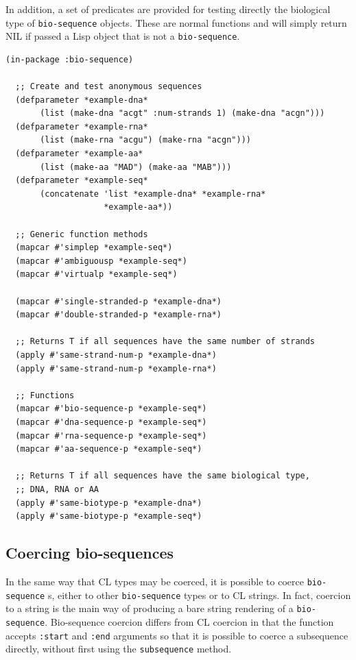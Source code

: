 \documentclass[a4paper, 12pt]{article}
\begin{document}
In addition, a set of predicates are provided for testing directly the
biological type of \lstinline!bio-sequence! objects. These are normal
functions and will simply return NIL if passed a Lisp object that is
not a \lstinline!bio-sequence!.

\begin{lstlisting}[caption={Testing bio-sequences},
  label=lst:testing-bioseq]
  (in-package :bio-sequence)

  ;; Create and test anonymous sequences
  (defparameter *example-dna*
       (list (make-dna "acgt" :num-strands 1) (make-dna "acgn")))
  (defparameter *example-rna*
       (list (make-rna "acgu") (make-rna "acgn")))
  (defparameter *example-aa*
       (list (make-aa "MAD") (make-aa "MAB")))
  (defparameter *example-seq*
       (concatenate 'list *example-dna* *example-rna*
                    *example-aa*))

  ;; Generic function methods
  (mapcar #'simplep *example-seq*)
  (mapcar #'ambiguousp *example-seq*)
  (mapcar #'virtualp *example-seq*)
  
  (mapcar #'single-stranded-p *example-dna*)
  (mapcar #'double-stranded-p *example-rna*)

  ;; Returns T if all sequences have the same number of strands
  (apply #'same-strand-num-p *example-dna*)
  (apply #'same-strand-num-p *example-rna*)
  
  ;; Functions
  (mapcar #'bio-sequence-p *example-seq*)
  (mapcar #'dna-sequence-p *example-seq*)
  (mapcar #'rna-sequence-p *example-seq*)
  (mapcar #'aa-sequence-p *example-seq*)

  ;; Returns T if all sequences have the same biological type,
  ;; DNA, RNA or AA
  (apply #'same-biotype-p *example-dna*)
  (apply #'same-biotype-p *example-seq*)
\end{lstlisting}

\subsection{Coercing bio-sequences}
\label{sec:coerce-bioseq}

In the same way that CL types may be coerced, it is possible to coerce
\lstinline!bio-sequence! s, either to other \lstinline!bio-sequence!
types or to CL strings. In fact, coercion to a string is the main way
of producing a bare string rendering of a
\lstinline!bio-sequence!. Bio-sequence coercion differs from CL
coercion in that the function accepts \lstinline!:start! and
\lstinline!:end! arguments so that it is possible to coerce a
subsequence directly, without first using the \lstinline!subsequence!
method.
\end{document}
